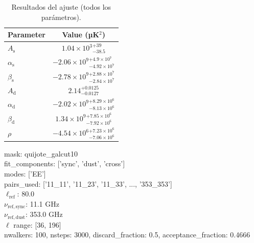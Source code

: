 \begin{table}[htbp]
\centering
\caption{Resultados del ajuste (todos los parámetros).}
\label{tab:fit_full}
\begin{tabular}{lc}
\hline
Parameter & Value (µK$^2$) \\
\hline
$A_{\mathrm{s}}$ & $1.04\times10^{3}{}^{+39}_{-38.5}$ \\
$\alpha_{\mathrm{s}}$ & $-2.06\times10^{9}{}^{+4.9\times10^{7}}_{-4.92\times10^{7}}$ \\
$\beta_{\mathrm{s}}$ & $-2.78\times10^{9}{}^{+2.88\times10^{7}}_{-2.84\times10^{7}}$ \\
$A_{\mathrm{d}}$ & $2.14{}^{+0.0125}_{-0.0127}$ \\
$\alpha_{\mathrm{d}}$ & $-2.02\times10^{9}{}^{+8.29\times10^{6}}_{-8.13\times10^{6}}$ \\
$\beta_{\mathrm{d}}$ & $1.34\times10^{9}{}^{+7.85\times10^{6}}_{-7.92\times10^{6}}$ \\
$\rho$ & $-4.54\times10^{6}{}^{+7.23\times10^{6}}_{-7.06\times10^{6}}$ \\
\hline
\end{tabular}
\vspace{0.3cm}
\begin{flushleft}
\footnotesize mask: quijote\_galcut10 \\
\footnotesize fit\_components: ['sync', 'dust', 'cross'] \\
\footnotesize modes: ['EE'] \\
\footnotesize pairs\_used: ['11\_11', '11\_23', '11\_33', ..., '353\_353'] \\
\footnotesize $\ell_\mathrm{ref}$: 80.0 \\
\footnotesize $\nu_\mathrm{ref,sync}$: 11.1 GHz \\
\footnotesize $\nu_\mathrm{ref,dust}$: 353.0 GHz \\
\footnotesize $\ell$ range: [36, 196] \\
\footnotesize nwalkers: 100, nsteps: 3000, discard\_fraction: 0.5, acceptance\_fraction: 0.4666 \\
\end{flushleft}
\end{table}
